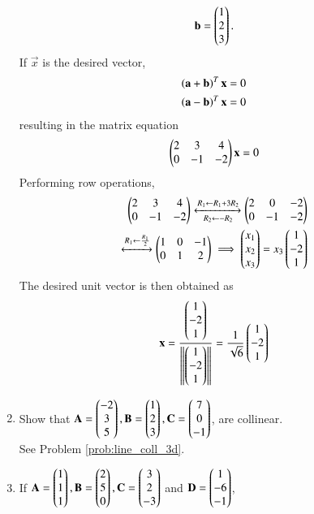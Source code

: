 \begin{enumerate}[label=\arabic*.,ref=\thesubsection.\theenumi]
\begin{align}
\mathbf{b}=\begin{pmatrix}1\\2\\3\end{pmatrix}.
\end{align}
%
\solution If $\vec{x}$ is the desired vector, 
%
\begin{align}
\left(\mathbf{a}+\mathbf{b}\right)^T\mathbf{x}=0
\\
\left(\mathbf{a}-\mathbf{b}\right)^T\mathbf{x}=0
\end{align}
%
resulting in the matrix equation 
%
\begin{align}
\begin{pmatrix}2 & 3 & 4\\
0 & -1 & -2\end{pmatrix}\mathbf{x} = 0
\end{align}
%
Performing row operations, 
%
\begin{align}
\begin{pmatrix}2 & 3 & 4\\
0 & -1 & -2\end{pmatrix}
\xleftrightarrow[R_2 \leftarrow -R_2]{R_1\leftarrow R_1+3R_2}
\begin{pmatrix}
2 & 0 & -2\\
0 & -1 & -2
\end{pmatrix} 
\\
\xleftrightarrow{R_1\leftarrow \frac{R_1}{2}}
\begin{pmatrix}
1 & 0 & -1\\
0 & 1 & 2
\end{pmatrix} 
\implies \begin{pmatrix}x_1\\x_2\\x_3\end{pmatrix} = x_3\begin{pmatrix}1\\-2\\1\end{pmatrix}
\end{align}
%
The desired unit vector is then obtained as
%
\begin{align}
\mathbf{x} =\frac{\begin{pmatrix}1\\-2\\1\end{pmatrix}}{\left\lVert\begin{pmatrix}1\\-2\\1\end{pmatrix}\right\rVert}
=\frac{1}{\sqrt{6}}\begin{pmatrix}1\\-2\\1\end{pmatrix}
\end{align}
\item Show that 
$\mathbf{A}=\begin{pmatrix}-2\\3\\5\end{pmatrix}, \mathbf{B}=\begin{pmatrix}1\\2\\3\end{pmatrix}, \mathbf{C}=\begin{pmatrix}7\\0\\-1\end{pmatrix}$, are collinear.
%
\\
\solution See Problem \ref{prob:line_coll_3d}.
\item If 
$\mathbf{A}=\begin{pmatrix}1\\1\\1\end{pmatrix}, \mathbf{B}=\begin{pmatrix}2\\5\\0\end{pmatrix}, \mathbf{C}=\begin{pmatrix}3\\2\\-3\end{pmatrix}$  and $ \mathbf{D}=\begin{pmatrix}1\\-6\\-1\end{pmatrix}$,

\end{enumerate}
